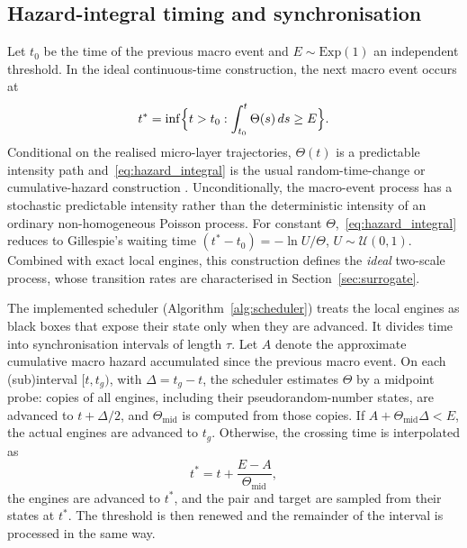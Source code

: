 \documentclass[a4paper,fleqn]{cas-sc}
\newcommand{\Exp}{\mathrm{Exp}}
\begin{document}
\subsection{Hazard-integral timing and synchronisation}
\label{sec:timing}

Let $t_0$ be the time of the previous macro event and $E\sim\Exp(1)$ an independent threshold. In the ideal continuous-time construction, the next macro event occurs at
\begin{equation}
\label{eq:hazard_integral}
t^\ast=\inf\Bigl\{t>t_0:\int_{t_0}^{t}\Theta(s)\,ds\ge E\Bigr\}.
\end{equation}
Conditional on the realised micro-layer trajectories, $\Theta(t)$ is a predictable intensity path and~\eqref{eq:hazard_integral} is the usual random-time-change or cumulative-hazard construction \citep{ethier1986,anderson2007}. Unconditionally, the macro-event process has a stochastic predictable intensity rather than the deterministic intensity of an ordinary non-homogeneous Poisson process. For constant $\Theta$,~\eqref{eq:hazard_integral} reduces to Gillespie's waiting time $(t^\ast-t_0)=-\ln U/\Theta$, $U\sim\mathcal{U}(0,1)$. Combined with exact local engines, this construction defines the \emph{ideal} two-scale process, whose transition rates are characterised in Section~\ref{sec:surrogate}.

The implemented scheduler (Algorithm~\ref{alg:scheduler}) treats the local engines as black boxes that expose their state only when they are advanced. It divides time into synchronisation intervals of length $\tau$. Let $A$ denote the approximate cumulative macro hazard accumulated since the previous macro event. On each (sub)interval $[t,t_g)$, with $\Delta=t_g-t$, the scheduler estimates $\Theta$ by a midpoint probe: copies of all engines, including their pseudorandom-number states, are advanced to $t+\Delta/2$, and $\Theta_{\mathrm{mid}}$ is computed from those copies. If $A+\Theta_{\mathrm{mid}}\Delta<E$, the actual engines are advanced to $t_g$. Otherwise, the crossing time is interpolated as
\begin{equation}
\label{eq:interpolation}
t^\ast=t+\frac{E-A}{\Theta_{\mathrm{mid}}},
\end{equation}
the engines are advanced to $t^\ast$, and the pair and target are sampled from their states at $t^\ast$. The threshold is then renewed and the remainder of the interval is processed in the same way.
\end{document}
